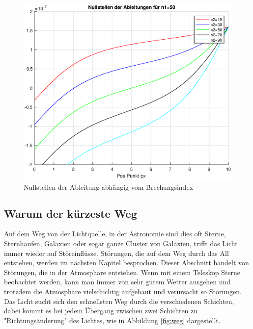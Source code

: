 \begin{refsection}
\begin{figure}
  \centering
  \includegraphics[width=1\textwidth]{adaptiv/images/Nullstellen}
  \caption{Nullstellen der Ableitung abhängig vom Brechungsindex}
  \label{fig:nullstelle}
\end{figure}

\subsection{Warum der kürzeste Weg}
Auf dem Weg von der Lichtquelle, in der Astronomie sind dies oft Sterne,
Sternhaufen, Galaxien oder sogar ganze Cluster von Galaxien, trifft
das Licht immer wieder auf Störeinflüsse. Störungen, die auf dem Weg
durch das All entstehen, werden im nächsten Kapitel besprochen. Dieser
Abschnitt handelt von Störungen, die in der Atmosphäre entstehen. Wenn
mit einem Teleskop Sterne beobachtet werden, kann man immer von sehr gutem
Wetter ausgehen und trotzdem die Atmosphäre vielschichtig aufgebaut
und verursacht so Störungen. Das Licht sucht sich den schnellsten Weg
durch die verschiedenen Schichten, dabei kommt es bei jedem Übergang
zwischen zwei Schichten zu "Richtungsänderung" des Lichtes, wie in
Abbildung \ref{fig:weg} dargestellt.


\end{refsection}
